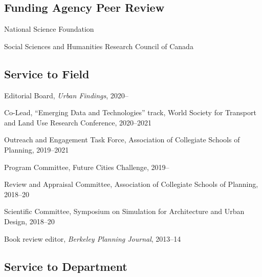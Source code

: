 \documentclass[12pt,letterpaper]{report}
\newcommand{\listitemspace}{0.25em}
\renewenvironment{itemize}
{\begin{list}{}{\setlength{\leftmargin}{0em}
            \setlength{\parskip}{0em}
            \setlength{\itemsep}{\listitemspace}
            \setlength{\parsep}{\listitemspace}}}
{\end{list}}
\begin{document}
    \subsection*{Funding Agency Peer Review}

    \begin{itemize}

        \item National Science Foundation

        \item Social Sciences and Humanities Research Council of Canada

    \end{itemize}

    \subsection*{Service to Field}

    \begin{itemize}

        \item Editorial Board, \textit{Urban Findings}, 2020--

        \item Co-Lead, \enquote{Emerging Data and Technologies} track, World Society for Transport and Land Use Research Conference, 2020--2021

        \item Outreach and Engagement Task Force, Association of Collegiate Schools of Planning, 2019--2021

        \item Program Committee, Future Cities Challenge, 2019--

        \item Review and Appraisal Committee, Association of Collegiate Schools of Planning, 2018--20

        \item Scientific Committee, Symposium on Simulation for Architecture and Urban Design, 2018--20

        \item Book review editor, \textit{Berkeley Planning Journal}, 2013--14

    \end{itemize}

    \subsection*{Service to Department}
\end{document}
